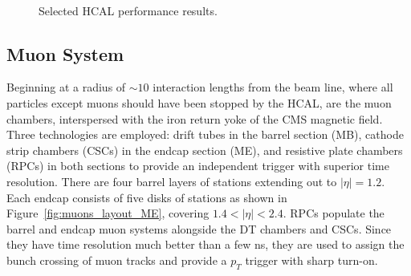 \documentclass[dissertation.tex]{subfiles}
\begin{document}
\begin{figure}
	\\
	\caption{Selected HCAL performance results.}
	\label{fig:HCAL_performance}
\end{figure}

\subsection{Muon System}

Beginning at a radius of $\sim10$ interaction lengths from the beam line, where all particles except muons should have been stopped by the HCAL, are the muon chambers, interspersed with the iron return yoke of the CMS magnetic field.  Three technologies are employed: drift tubes in the barrel section (MB), cathode strip chambers (CSCs) in the endcap section (ME), and resistive plate chambers (RPCs) in both sections to provide an independent trigger with superior time resolution.  There are four barrel layers of stations extending out to $|\eta| = 1.2$.  Each endcap consists of five disks of stations as shown in Figure~\ref{fig:muons_layout_ME}, covering $1.4 < |\eta| < 2.4$.  RPCs populate the barrel and endcap muon systems alongside the DT chambers and CSCs.  Since they have time resolution much better than a few ns, they are used to assign the bunch crossing of muon tracks and provide a $p_{T}$ trigger with sharp turn-on.
\end{document}
